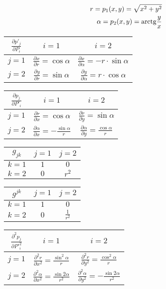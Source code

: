 \begin{equation}
\begin{split}
r = p_1(x, y) = \sqrt{x^2 + y^2} \\
\alpha = p_2(x, y) = \mathrm{arctg} \frac{y}{x}
\end{split}
\end{equation}

\begin{tabular}{| c || c | c |}
\hline
\(\frac{\partial p'_j}{\partial P_i}\) & \(i=1\) & \(i=2\) \\
\hline
\hline
\(j=1\) & \(\frac{\partial x}{\partial r} = \cos \alpha\) & \(\frac{\partial x}{\partial \alpha} = -r \cdot \sin \alpha\) \\
\hline
\(j=2\) & \(\frac{\partial y}{\partial r} = \sin \alpha\) & \(\frac{\partial y}{\partial \alpha} = r \cdot \cos \alpha\) \\
\hline
\end{tabular}

\begin{tabular}{| c || c | c |}
\hline
\(\frac{\partial p_j}{\partial P'_i}\) & \(i=1\) & \(i=2\) \\
\hline
\hline
\(j=1\) & \(\frac{\partial r}{\partial x} = \cos \alpha\) & \(\frac{\partial r}{\partial y} = \sin \alpha\) \\
\hline
\(j=2\) & \(\frac{\partial \alpha}{\partial x} = -\frac{\sin \alpha}{r}\) & \(\frac{\partial \alpha}{\partial y} = \frac{\cos \alpha}{r}\) \\
\hline
\end{tabular}

\begin{tabular}{| c || c | c |}
\hline
\(g_{jk}\) & \(j=1\) & \(j=2\) \\
\hline
\hline
\(k=1\) & \(1\) & \(0\) \\
\hline
\(k=2\) & \(0\) & \(r^2\) \\
\hline
\end{tabular}

\begin{tabular}{| c || c | c |}
\hline
\(g^{jk}\) & \(j=1\) & \(j=2\) \\
\hline
\hline
\(k=1\) & \(1\) & \(0\) \\
\hline
\(k=2\) & \(0\) & \(\frac{1}{r^2}\) \\
\hline
\end{tabular}

\begin{tabular}{| c || c | c |}
\hline
\(\frac{\partial^2 p_j}{\partial P'^2_i}\) & \(i=1\) & \(i=2\) \\
\hline
\hline
\(j=1\) & \(\frac{\partial^2 r}{\partial x^2} = \frac{\sin^2 \alpha}{r}\) & \(\frac{\partial^2 r}{\partial y^2} = \frac{\cos^2 \alpha}{r}\) \\
\hline
\(j=2\) & \(\frac{\partial^2 \alpha}{\partial x^2} = \frac{\sin 2\alpha}{r^2}\) & \(\frac{\partial^2 \alpha}{\partial y^2} = -\frac{\sin 2\alpha}{r^2}\) \\
\hline
\end{tabular}

